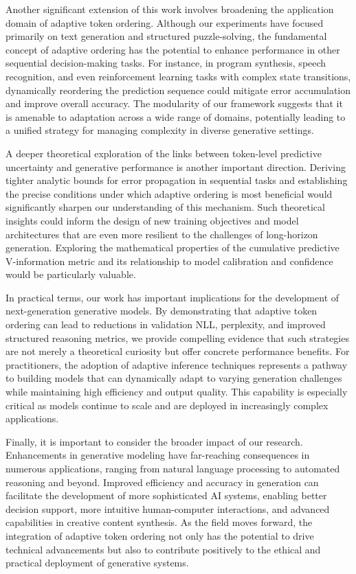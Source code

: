 \documentclass{article} %
\begin{document}
\par Another significant extension of this work involves broadening the application domain of adaptive token ordering. Although our experiments have focused primarily on text generation and structured puzzle-solving, the fundamental concept of adaptive ordering has the potential to enhance performance in other sequential decision-making tasks. For instance, in program synthesis, speech recognition, and even reinforcement learning tasks with complex state transitions, dynamically reordering the prediction sequence could mitigate error accumulation and improve overall accuracy. The modularity of our framework suggests that it is amenable to adaptation across a wide range of domains, potentially leading to a unified strategy for managing complexity in diverse generative settings.

\par A deeper theoretical exploration of the links between token-level predictive uncertainty and generative performance is another important direction. Deriving tighter analytic bounds for error propagation in sequential tasks and establishing the precise conditions under which adaptive ordering is most beneficial would significantly sharpen our understanding of this mechanism. Such theoretical insights could inform the design of new training objectives and model architectures that are even more resilient to the challenges of long-horizon generation. Exploring the mathematical properties of the cumulative predictive V-information metric and its relationship to model calibration and confidence would be particularly valuable.

\par In practical terms, our work has important implications for the development of next-generation generative models. By demonstrating that adaptive token ordering can lead to reductions in validation NLL, perplexity, and improved structured reasoning metrics, we provide compelling evidence that such strategies are not merely a theoretical curiosity but offer concrete performance benefits. For practitioners, the adoption of adaptive inference techniques represents a pathway to building models that can dynamically adapt to varying generation challenges while maintaining high efficiency and output quality. This capability is especially critical as models continue to scale and are deployed in increasingly complex applications.

\par Finally, it is important to consider the broader impact of our research. Enhancements in generative modeling have far-reaching consequences in numerous applications, ranging from natural language processing to automated reasoning and beyond. Improved efficiency and accuracy in generation can facilitate the development of more sophisticated AI systems, enabling better decision support, more intuitive human-computer interactions, and advanced capabilities in creative content synthesis. As the field moves forward, the integration of adaptive token ordering not only has the potential to drive technical advancements but also to contribute positively to the ethical and practical deployment of generative systems.
\end{document}

